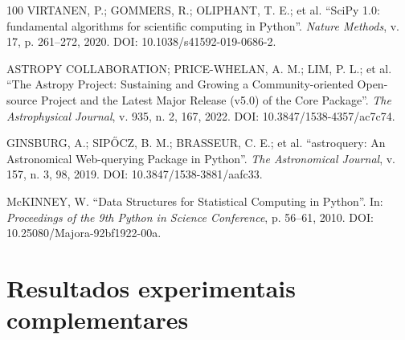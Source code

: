 \documentclass[msc]{on} %
\begin{document}
\begin{thebibliography}{100}
 VIRTANEN, P.; GOMMERS, R.; OLIPHANT, T. E.; et al. ``SciPy 1.0: fundamental algorithms for scientific computing in Python''. \emph{Nature Methods}, v. 17, p. 261--272, 2020. DOI: 10.1038/s41592-019-0686-2.

 ASTROPY COLLABORATION; PRICE-WHELAN, A. M.; LIM, P. L.; et al. ``The Astropy Project: Sustaining and Growing a Community-oriented Open-source Project and the Latest Major Release (v5.0) of the Core Package''. \emph{The Astrophysical Journal}, v. 935, n. 2, 167, 2022. DOI: 10.3847/1538-4357/ac7c74.

 GINSBURG, A.; SIP\H{O}CZ, B. M.; BRASSEUR, C. E.; et al. ``astroquery: An Astronomical Web-querying Package in Python''. \emph{The Astronomical Journal}, v. 157, n. 3, 98, 2019. DOI: 10.3847/1538-3881/aafc33.

 McKINNEY, W. ``Data Structures for Statistical Computing in Python''. In: \emph{Proceedings of the 9th Python in Science Conference}, p. 56--61, 2010. DOI: 10.25080/Majora-92bf1922-00a.

%
\end{thebibliography}

\appendix
\chapter{Resultados experimentais complementares}
\label{ap:experimentos}
\end{document}

